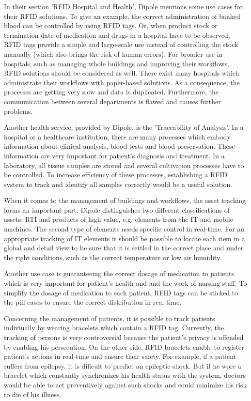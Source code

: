 In their section 'RFID Hospital and Health', Dipole mentions some use cases for their RFID solutions. To give an example, the correct administration of banked blood can be controlled by using RFID tags. Or, when product stock or termination date of medication and drugs in a hospital have to be observed, RFID tags provide a simple and large-scale use instead of controlling the stock manually (which also brings the risk of human errors). For broader use in hospitals, such as managing whole buildings and improving their workflows, RFID solutions should be considered as well. There exist many hospitals which administrate their workflows with paper-based solutions. As a consequence, the processes are getting very slow and data is duplicated. Furthermore, the communication between several departments is flawed and causes further problems.

Another health service, provided by Dipole, is the 'Traceability of Analysis'. In a hospital or a healthcare institution, there are many processes which embody information about clinical analysis, blood tests and blood preservation. These information are very important for patient's diagnosis and treatment. In a laboratory, all tissue samples are stored and several cultivation processes have to be controlled. To increase efficiency of these processes, establishing a RFID system to track and identify all samples correctly would be a useful solution.

When it comes to the management of buildings and workflows, the asset tracking forms an important part. Dipole distinguishes two different classifications of assets: \ac{RTI} and products of high value, e.g. elements from the IT and mobile machines. The second type of elements needs specific control in real-time. For an appropriate tracking of IT elements it should be possible to locate each item in a global and detail view to be sure that it is settled in the correct place and under the right conditions, such as the correct temperature or low air humidity.

Another use case is guaranteeing the correct dosage of medication to patients which is very important for patient's health and and the work of nursing staff. To simplify the dosage of medication to each patient, RFID tags can be sticked to the pill cases to ensure the correct distribution in real-time. 

Concerning the management of patients, it is possible to track patients indiviually by wearing bracelets which contain a RFID tag. Currently, the tracking of persons is very controversial because the patient's privacy is offended by enabling his persecution. On the other side, RFID bracelets enable to register patient's actions in real-time and ensure their safety. For example, if a patient suffers from epilepsy, it is dificult to predict an epileptic shock. But if he wore a bracelet which constantly synchronizes his health status with the system, doctors would be able to act preventively against such shocks and could minimize his risk to die of his illness.

